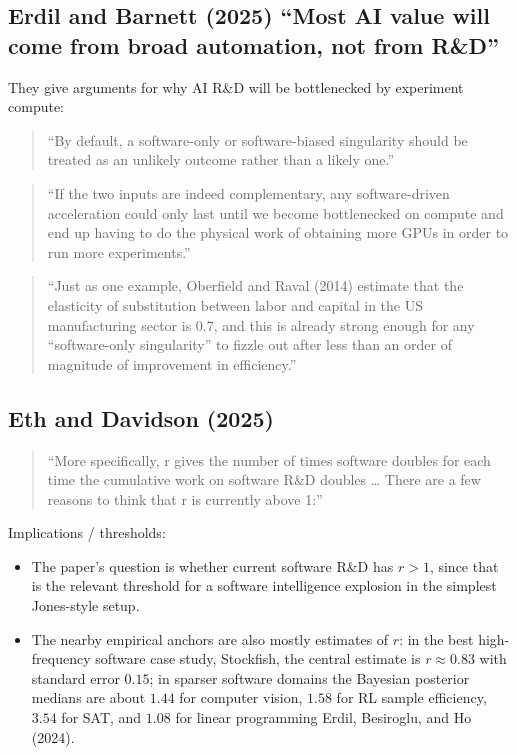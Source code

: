 \documentclass[
  11pt,
  letterpaper,
  DIV=11,
  numbers=noendperiod]{scrartcl}
\providecommand{\tightlist}{%
  \setlength{\itemsep}{0pt}\setlength{\parskip}{0pt}}
\begin{document}
\subsection{Erdil and Barnett (2025) ``Most AI value will come from
broad automation, not from
R\&D''}\label{erdil2025automatingrd-most-ai-value-will-come-from-broad-automation-not-from-rd}

They give arguments for why AI R\&D will be bottlenecked by experiment
compute:

\begin{quote}
``By default, a software-only or software-biased singularity should be
treated as an unlikely outcome rather than a likely one.''
\end{quote}

\begin{quote}
``If the two inputs are indeed complementary, any software-driven
acceleration could only last until we become bottlenecked on compute and
end up having to do the physical work of obtaining more GPUs in order to
run more experiments.''
\end{quote}

\begin{quote}
``Just as one example, Oberfield and Raval (2014) estimate that the
elasticity of substitution between labor and capital in the US
manufacturing sector is 0.7, and this is already strong enough for any
``software-only singularity'' to fizzle out after less than an order of
magnitude of improvement in efficiency.''
\end{quote}

\subsection{Eth and Davidson (2025)}\label{eth2025willairdautomati}

\begin{quote}
``More specifically, r gives the number of times software doubles for
each time the cumulative work on software R\&D doubles \ldots{} There
are a few reasons to think that r is currently above 1:''
\end{quote}

Implications / thresholds:

\begin{itemize}
\tightlist
\item
  The paper's question is whether current software R\&D has \(r>1\),
  since that is the relevant threshold for a software intelligence
  explosion in the simplest Jones-style setup.
\item
  The nearby empirical anchors are also mostly estimates of \(r\): in
  the best high-frequency software case study, Stockfish, the central
  estimate is \(r \approx 0.83\) with standard error \(0.15\); in
  sparser software domains the Bayesian posterior medians are about
  \(1.44\) for computer vision, \(1.58\) for RL sample efficiency,
  \(3.54\) for SAT, and \(1.08\) for linear programming Erdil,
  Besiroglu, and Ho (2024).
\end{itemize}
\end{document}
